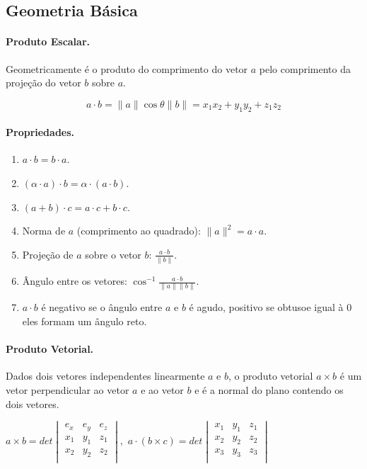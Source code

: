 \subsection{Geometria Básica}
\paragraph{Produto Escalar.}
Geometricamente é o produto do comprimento do vetor $a$ pelo comprimento da projeção do vetor $b$ sobre $a$.

$$a \cdot b = \|a\|\cos\theta \|b\| = x_1x_2+y_1y_2+z_1z_2$$

\paragraph{Propriedades.} \empty

\begin{multicols}{2}
	\begin{enumerate}
		\item $a \cdot b = b \cdot a$.
		\item $(\alpha \cdot a) \cdot b = \alpha\cdot(a \cdot b)$.
		\item $(a+b)\cdot c = a\cdot c + b \cdot c$.
		\item Norma de $a$ (comprimento ao quadrado): $\|a\|^2 = a \cdot a$.
		\item Projeção de $a$ sobre o vetor $b$: $\frac{a \cdot b}{\|b\|}$.
		\item Ângulo entre os vetores: $\cos^{-1}{\frac{a \cdot b}{\|a\|\|b\|}}$.
		\item $a \cdot b$ é negativo se o ângulo entre $a$ e $b$ é agudo, positivo se obtusoe igual à 0 eles formam um ângulo reto.	
	\end{enumerate}
\end{multicols}

\paragraph{Produto Vetorial.}
Dados dois vetores independentes linearmente $a$ e $b$, o produto vetorial $a \times b$ é um vetor perpendicular ao vetor $a$ e ao vetor $b$ e é a normal do plano contendo os dois vetores.

\begin{center}
	$
	a \times b = det
	\begin{vmatrix}
		e_x & e_y & e_z \\
		x_1 & y_1 & z_1 \\
		x_2 & y_2 & z_2 \\
	\end{vmatrix}, 
	$
	$
	a \cdot (b \times c) = det
	\begin{vmatrix}
		x_1 & y_1 & z_1 \\
		x_2 & y_2 & z_2 \\
		x_3 & y_3 & z_3 \\	
	\end{vmatrix}
	$
\end{center}

